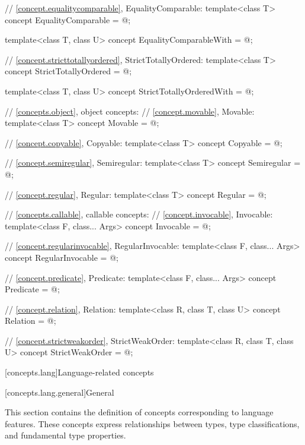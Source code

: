 \begin{codeblock}
{  // \ref{concept.equalitycomparable}, EqualityComparable:
  template<class T>
  concept EqualityComparable = @\seebelow@;

  template<class T, class U>
  concept EqualityComparableWith = @\seebelow@;

  // \ref{concept.stricttotallyordered}, StrictTotallyOrdered:
  template<class T>
  concept StrictTotallyOrdered = @\seebelow@;

  template<class T, class U>
  concept StrictTotallyOrderedWith = @\seebelow@;

  // \ref{concepts.object}, object concepts:
  // \ref{concept.movable}, Movable:
  template<class T>
  concept Movable = @\seebelow@;

  // \ref{concept.copyable}, Copyable:
  template<class T>
  concept Copyable = @\seebelow@;

  // \ref{concept.semiregular}, Semiregular:
  template<class T>
  concept Semiregular = @\seebelow@;

  // \ref{concept.regular}, Regular:
  template<class T>
  concept Regular = @\seebelow@;

  // \ref{concepts.callable}, callable concepts:
  // \ref{concept.invocable}, Invocable:
  template<class F, class... Args>
  concept Invocable = @\seebelow@;

  // \ref{concept.regularinvocable}, RegularInvocable:
  template<class F, class... Args>
  concept RegularInvocable = @\seebelow@;

  // \ref{concept.predicate}, Predicate:
  template<class F, class... Args>
  concept Predicate = @\seebelow@;

  // \ref{concept.relation}, Relation:
  template<class R, class T, class U>
  concept Relation = @\seebelow@;

  // \ref{concept.strictweakorder}, StrictWeakOrder:
  template<class R, class T, class U>
  concept StrictWeakOrder = @\seebelow@;
}
\end{codeblock}

[concepts.lang]{Language-related concepts}

[concepts.lang.general]{General}

\pnum
This section contains the definition of concepts corresponding to language
features. These concepts express relationships between types, type
classifications, and fundamental type properties.

